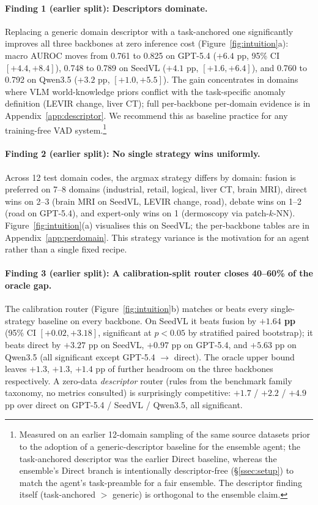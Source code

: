 \paragraph{Finding 1 (earlier split): Descriptors dominate.}
\label{ssec:descriptor_ablation}
Replacing a generic domain descriptor with a task-anchored one significantly improves all three backbones at zero inference cost (Figure~\ref{fig:intuition}a): macro AUROC moves from 0.761 to 0.825 on GPT-5.4 ($+6.4$ pp, 95\% CI $[+4.4,+8.4]$), 0.748 to 0.789 on SeedVL ($+4.1$ pp, $[+1.6,+6.4]$), and 0.760 to 0.792 on Qwen3.5 ($+3.2$ pp, $[+1.0,+5.5]$). The gain concentrates in domains where VLM world-knowledge priors conflict with the task-specific anomaly definition (LEVIR change, liver CT); full per-backbone per-domain evidence is in Appendix~\ref{app:descriptor}. We recommend this as baseline practice for any training-free VAD system.\footnote{Measured on an earlier 12-domain sampling of the same source datasets prior to the adoption of a generic-descriptor baseline for the ensemble agent; the task-anchored descriptor was the earlier Direct baseline, whereas the ensemble's Direct branch is intentionally descriptor-free (\S\ref{ssec:setup}) to match the agent's task-preamble for a fair ensemble. The descriptor finding itself (task-anchored $>$ generic) is orthogonal to the ensemble claim.}

\paragraph{Finding 2 (earlier split): No single strategy wins uniformly.}
Across 12 test domain codes, the argmax strategy differs by domain: fusion is preferred on 7--8 domains (industrial, retail, logical, liver CT, brain MRI), direct wins on 2--3 (brain MRI on SeedVL, LEVIR change, road), debate wins on 1--2 (road on GPT-5.4), and expert-only wins on 1 (dermoscopy via patch-$k$-NN). Figure~\ref{fig:intuition}(a) visualises this on SeedVL; the per-backbone tables are in Appendix~\ref{app:perdomain}. This strategy variance is the motivation for an agent rather than a single fixed recipe.

\paragraph{Finding 3 (earlier split): A calibration-split router closes 40--60\% of the oracle gap.}
The calibration router (Figure~\ref{fig:intuition}b) matches or beats every single-strategy baseline on every backbone. On SeedVL it beats fusion by \textbf{$+1.64$ pp} (95\% CI $[+0.02, +3.18]$, significant at $p{<}0.05$ by stratified paired bootstrap); it beats direct by $+3.27$ pp on SeedVL, $+0.97$ pp on GPT-5.4, and $+5.63$ pp on Qwen3.5 (all significant except GPT-5.4 $\to$ direct). The oracle upper bound leaves $+1.3$, $+1.3$, $+1.4$ pp of further headroom on the three backbones respectively. A zero-data \emph{descriptor} router (rules from the benchmark family taxonomy, no metrics consulted) is surprisingly competitive: $+1.7$ / $+2.2$ / $+4.9$ pp over direct on GPT-5.4 / SeedVL / Qwen3.5, all significant.

